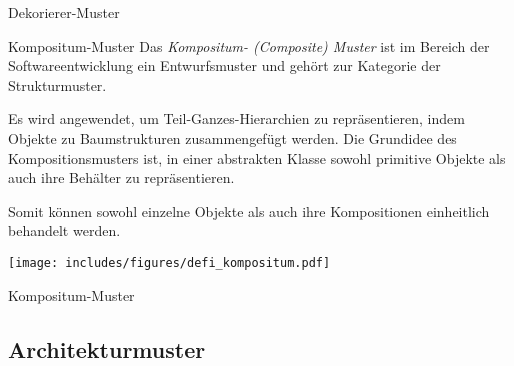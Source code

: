 \begin{example}{Dekorierer-Muster}

    

    
\end{example}

\begin{defi}{Kompositum-Muster}
    Das \emph{Kompositum- (Composite) Muster} ist im Bereich der Softwareentwicklung ein Entwurfsmuster und gehört zur Kategorie der Strukturmuster.

    Es wird angewendet, um Teil-Ganzes-Hierarchien zu repräsentieren, indem Objekte zu Baumstrukturen zusammengefügt werden.
    Die Grundidee des Kompositionsmusters ist, in einer abstrakten Klasse sowohl primitive Objekte als auch ihre Behälter zu repräsentieren.

    Somit können sowohl einzelne Objekte als auch ihre Kompositionen einheitlich behandelt werden.

    \begin{center}
        \texttt{[image: includes/figures/defi\_kompositum.pdf]}
    \end{center}
\end{defi}

\begin{example}{Kompositum-Muster}
    

    
\end{example}

\subsection{Architekturmuster}

